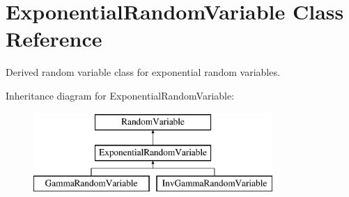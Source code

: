 \section{Exponential\+Random\+Variable Class Reference}
\label{classPecos_1_1ExponentialRandomVariable}


Derived random variable class for exponential random variables.  


Inheritance diagram for Exponential\+Random\+Variable\+:\begin{figure}[H]
\begin{center}
\leavevmode
\includegraphics[height=3.000000cm]{classPecos_1_1ExponentialRandomVariable}
\end{center}
\end{figure}
